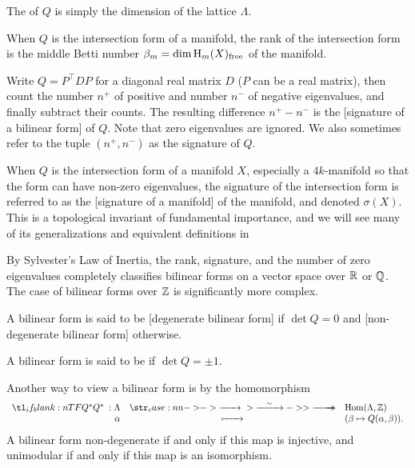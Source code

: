 \begin{definition}[Rank]
	The  of $Q$ is simply the dimension of the lattice $\Lambda$.
\end{definition}

When $Q$ is the intersection form of a manifold, the rank of the intersection form is the middle Betti number $\beta_m = \dim \operatorname{H}_m(X)_{\textrm{free}}$ of the manifold.

\begin{definition}[Signature]
	Write $Q=P^\intercal D P$ for a diagonal real matrix $D$ ($P$ can be a real matrix), then count the number $n^+$ of positive and number $n^-$ of negative eigenvalues, and finally subtract their counts. The resulting difference $n^+ - n^-$ is the [signature of a bilinear form] of $Q$. Note that zero eigenvalues are ignored. We also sometimes refer to the tuple $(n^+, n^-)$ as the signature of $Q$.
\end{definition}

When $Q$ is the intersection form of a manifold $X$, especially a $4k$-manifold so that the form can have non-zero eigenvalues, the signature of the intersection form is referred to as the [signature of a manifold] of the manifold, and denoted $\sigma(X)$. This is a topological invariant of fundamental importance, and we will see many of its generalizations and equivalent definitions in 

\begin{remark}
	By Sylvester's Law of Inertia, the rank, signature, and the number of zero eigenvalues completely classifies bilinear forms on a vector space over $\mathbb{R}$ or $\mathbb{Q}$. The case of bilinear forms over $\mathbb{Z}$ is significantly more complex.
\end{remark}

\begin{definition}
	A bilinear form is said to be [degenerate bilinear form] if $\det Q=0$ and [non-degenerate bilinear form] otherwise.
\end{definition}

\begin{definition}[Unimodularity]
	A bilinear form is said to be  if $\det Q=\pm 1$.
\end{definition}

Another way to view a bilinear form is by the homomorphism
\[
	\lkxfunc{Q^\d}{\Lambda}{\Hom(\Lambda, \Z)}{\alpha}{(\beta\mapsto Q(\alpha,\beta)).}
\]
A bilinear form non-degenerate if and only if this map is injective, and unimodular if and only if this map is an isomorphism.

